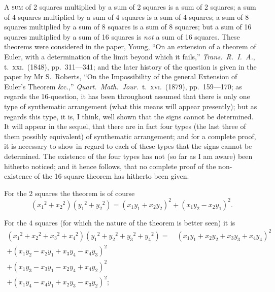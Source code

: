 \documentclass[11pt,a4paper,english]{article}
\theoremstyle{plain}
\begin{document}
\textsc{A} \textsc{sum} of 2 squares multiplied by a sum of 2 squares is a sum of 2 squares; a sum of 4 squares multiplied by a sum of 4 squares is a sum of 4 squares; a sum of 8 squares multiplied by a sum of 8 squares is a sum of 8 squares; but a sum of 16 squares multiplied by a sum of 16 squares is \textit{not} a sum of 16 squares. These theorems were considered in the paper, Young, ``On an extension of a theorem of Euler, with a determination of the limit beyond which it fails,'' \textit{Trans.\ R.\ I.\ A.}, t.\ \textsc{xxi}.\ (1848), pp.\ 311---341; and the later history of the question is given in the paper by Mr S.\ Roberts, ``On the Impossibility of the general Extension of Euler's Theorem \&c.,'' \textit{Quart.\ Math.\ Jour.}\ t.\ \textsc{xvi}.\ (1879), pp.\ 159---170; as regards the 16-question, it has been throughout assumed that there is only one type of synthematic arrangement (what this means will appear presently); but as regards this type, it is, I think, well shown that the signs cannot be determined. It will appear in the sequel, that there are in fact four types (the last three of them possibly equivalent) of synthematic arrangement; and for a complete proof, it is necessary to show in regard to each of these types that the signs cannot be determined. The existence of the four types has not (so far as I am aware) been hitherto noticed; and it hence follows, that no complete proof of the non-existence of the 16-square theorem has hitherto been given.

For the 2 squares the theorem is of course
\[
({x_1}^2 + {x_2}^2)({y_1}^2 + {y_2}^2) = (x_1y_1 + x_2y_2)^2 + (x_1y_2 - x_2y_1)^2.
\]

For the 4 squares (for which the nature of the theorem is better seen) it is
\begin{multline*}
({x_1}^2 + {x_2}^2 + {x_3}^2 + {x_4}^2)({y_1}^2 + {y_2}^2 + {y_3}^2 + {y_4}^2) = \quad (x_1y_1 + x_2y_2 + x_3y_3 + x_4y_4)^2 \\
+ (x_1y_2 - x_2y_1 + x_3y_4 - x_4y_3)^2 \\
+ (x_1y_3 - x_3y_1 - x_2y_4 + x_4y_2)^2 \\
+ (x_1y_4 - x_4y_1 + x_2y_3 - x_3y_2)^2;
\end{multline*}
\end{document}
